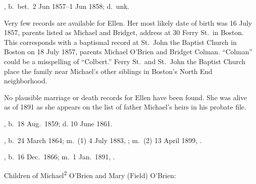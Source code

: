 \begin{Kids}
	
	, b.\ bet.\ 2 Jun 1857--1 Jun 1858;\cite{Census1870Ellen3OBrien2,Census1880Ellen3OBrien2} d.\ unk.
	
	\begin{KidsMoreText}
		Very few records are available for Ellen. Her most likely date of birth was 16 July 1857, parents listed as Michael and Bridget, address at 30 Ferry St.\ in Boston.\cite{Ellen3OBrien2Birth} This corresponds with a baptismal record at St.\ John the Baptist Church in Boston on 18 July 1857, parents Michael O'Brien and Bridget Colman.\cite{Ellen3OBrien2Baptism} ``Colman'' could be a misspelling of ``Colbert.'' Ferry St.\ and St.\ John the Baptist Church place the family near Michael's other siblings in Boston's North End neighborhood.\cite{Boston1861Map}
		
		No plausible marriage or death records for Ellen have been found. She was alive as of 1891 as she appears on the list of father Michael's heirs in his probate file.\cite{Michael2OBrienProbate}
	\end{KidsMoreText}
	
	, b.\ 18 Aug.\ 1859;\cite{MaryAnn3OBrien2Birth} d. 10 June 1861.\cite{MaryAnn3OBrien2Death}
	
	, b.\ 24 March 1864; m.\ (1) 4 July 1883, ; m.\ (2) 13 April 1899, .
	
	, b.\ 16 Dec.\ 1866; m.\ 1 Jan.\ 1891, .
	
\end{Kids}

\begin{KidsIntro}
	Children of Michael\textsuperscript{2} O'Brien and Mary (Field) O'Brien:
\end{KidsIntro}

